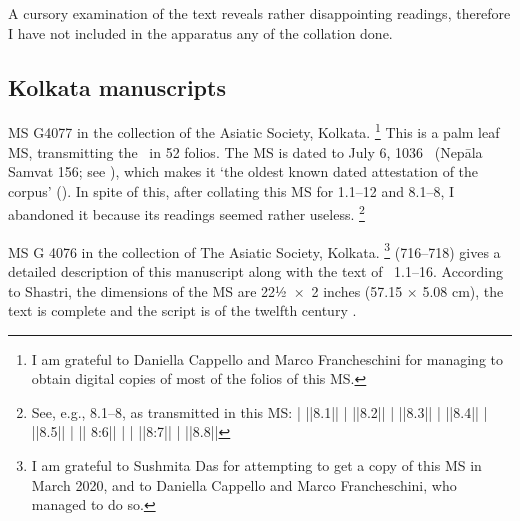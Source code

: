 A cursory examination of the text reveals rather disappointing 
readings, therefore I have not included  in the apparatus
any of the collation done.

\medskip
\subsection{Kolkata manuscripts}






MS G4077 in the collection of the Asiatic Society, Kolkata.%
	\footnote{I am grateful to Daniella Cappello and Marco Francheschini
                  for managing to obtain digital copies of most of the folios of this MS.}
This is a palm leaf MS, transmitting the \VSS\ in 52 folios.
The MS is dated to July 6, 1036 \CE\ (Nepāla Samvat 156; 
see ), which makes
it `the oldest known dated attestation of the corpus'
().
In spite of this, after collating this MS for 1.1--12 and 8.1--8,
I abandoned it because its readings seemed rather useless.%
        \footnote{See, e.g., 8.1--8, as transmitted in this MS:
         |
         ||8.1||
         |
         ||8.2||
         |
         ||8.3||
         |
         ||8.4||
         |
         ||8.5||
         |
         || 8:6||
         |
         |
         ||8:7||
         |
         ||8.8||}

MS G 4076 in the collection of The Asiatic Society, Kolkata.%
	\footnote{I am grateful to Sushmita Das for attempting to 
			get a copy of this MS in March 2020,
                        and to Daniella Cappello and Marco Francheschini, who
                        managed to do so.}
 (716--718) gives a 
detailed description of this manuscript along with the text
of \VSS\ 1.1--16. According to Shastri, the dimensions of the MS are
22½~×~2 inches (57.15 × 5.08 cm), the text is complete and
the script is of the twelfth century \CE. 

